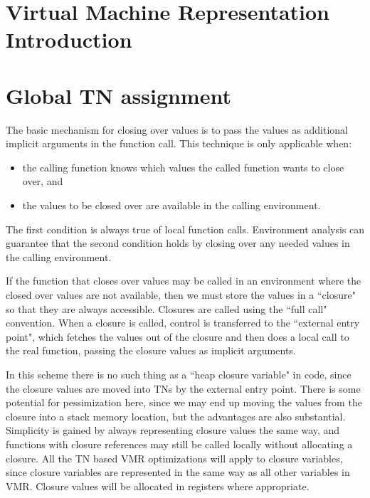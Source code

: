 

\chapter{Virtual Machine Representation Introduction}


\chapter{Global TN assignment}


The basic mechanism for closing over values is to pass the values as additional
implicit arguments in the function call.  This technique is only applicable
when:

\begin{itemize}
\item the calling function knows which values the called function wants to close
    over, and
\item the values to be closed over are available in the calling
  environment.
\end{itemize}

The first condition is always true of local function calls.  Environment
analysis can guarantee that the second condition holds by closing over any
needed values in the calling environment.

If the function that closes over values may be called in an environment where
the closed over values are not available, then we must store the values in a
``closure" so that they are always accessible.  Closures are called using the
``full call" convention.  When a closure is called, control is transferred to
the ``external entry point", which fetches the values out of the closure and
then does a local call to the real function, passing the closure values as
implicit arguments.

In this scheme there is no such thing as a ``heap closure variable" in code,
since the closure values are moved into TNs by the external entry point.  There
is some potential for pessimization here, since we may end up moving the values
from the closure into a stack memory location, but the advantages are also
substantial.  Simplicity is gained by always representing closure values the
same way, and functions with closure references may still be called locally
without allocating a closure.  All the TN based VMR optimizations will apply
to closure variables, since closure variables are represented in the same way
as all other variables in VMR.  Closure values will be allocated in registers
where appropriate.

